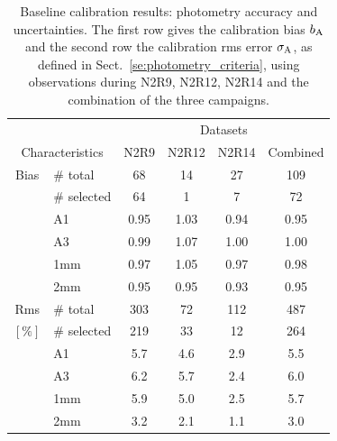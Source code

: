 \begin{table}[th]
\begin{center}
\begin{tabular}{|c|l|c|c|c|c|}
  \hline
  \multicolumn{2}{|c|}{}  &  \multicolumn{4}{|c|}{Datasets}  \\\cline{3-6}
  \multicolumn{2}{|c|}{Characteristics} &  N2R9  & N2R12   &  N2R14 &  Combined \\
  \hline\hline
  Bias &  $\#$ total    &  68    &  14     &   27     &    109    \\
       &  $\#$ selected &  64    &   1     &   7      &     72    \\
       &  A1            &  0.95  &  1.03   &   0.94   &   0.95    \\
       &  A3            &  0.99  &  1.07   &   1.00   &   1.00    \\
       &  1mm           &  0.97  &  1.05   &   0.97   &   0.98    \\
       &  2mm           &  0.95  &  0.95   &   0.93   &   0.95    \\
  \hline
  Rms  &  $\#$ total    &  303   &  72     &   112    &    487   \\
  $[\%]$ &  $\#$ selected &  219   &  33     &    12    &    264   \\
       &  A1            &  5.7   &  4.6    &   2.9    &    5.5   \\
       &  A3            &  6.2   &  5.7    &   2.4    &    6.0   \\
       &  1mm           &  5.9   &  5.0    &   2.5    &    5.7   \\
       &  2mm           &  3.2   &  2.1    &   1.1    &    3.0   \\  
\hline\hline
\end{tabular}
\caption[Baseline calibration results]{Baseline calibration results:
  photometry accuracy and uncertainties. The first row gives the
  calibration bias $b_{\rm A}$ and the second row the calibration
  rms error $\sigma_{\rm A}$, as defined in
  Sect.~\ref{se:photometry_criteria},
  using observations during N2R9, N2R12, N2R14 and the combination of
  the three campaigns.}
\label{tab:baseline-photometry}
\end{center}
\end{table}


